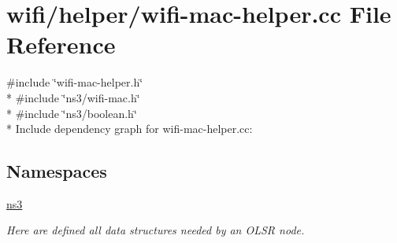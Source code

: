 \hypertarget{wifi-mac-helper_8cc}{}\section{wifi/helper/wifi-\/mac-\/helper.cc File Reference}
\label{wifi-mac-helper_8cc}
{\ttfamily \#include \char`\"{}wifi-\/mac-\/helper.\+h\char`\"{}}\\*
{\ttfamily \#include \char`\"{}ns3/wifi-\/mac.\+h\char`\"{}}\\*
{\ttfamily \#include \char`\"{}ns3/boolean.\+h\char`\"{}}\\*
Include dependency graph for wifi-\/mac-\/helper.cc\+:
\subsection*{Namespaces}
\begin{DoxyCompactItemize}
\item 
 \hyperlink{namespacens3}{ns3}
\begin{DoxyCompactList}\small\item\em Here are defined all data structures needed by an O\+L\+SR node. \end{DoxyCompactList}\end{DoxyCompactItemize}
